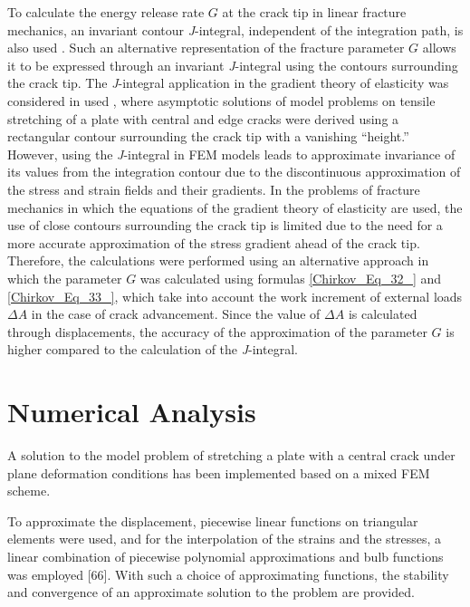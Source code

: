 To calculate the energy release rate $G$ at the crack tip in linear fracture mechanics, an invariant contour \textit{J}-integral, independent of the integration path, is also used \cite{Chirkov64, Chirkov65}. Such an alternative representation of the fracture parameter $G$ allows it to be expressed through an invariant \textit{J}-integral using the contours surrounding the crack tip. The \textit{J}-integral application in the gradient theory of elasticity was considered in used \cite{Chirkov62, Chirkov65}, where asymptotic solutions of model problems on tensile stretching of a plate with central and edge cracks were derived using a rectangular contour surrounding the crack tip with a vanishing ``height.'' However, using the \textit{J}-integral in FEM models leads to approximate invariance of its values from the integration contour due to the discontinuous approximation of the stress and strain fields and their gradients. In the problems of fracture mechanics in which the equations of the gradient theory of elasticity are used, the use of close contours surrounding the crack tip is limited due to the need for a more accurate approximation of the stress gradient ahead of the crack tip. Therefore, the calculations were performed using an alternative approach in which the parameter $G$ was calculated using formulas \eqref{Chirkov_Eq_32_} and \eqref{Chirkov_Eq_33_}, which take into account the work increment of external loads $\Delta A$ in the case of crack advancement. Since the value of $\Delta A$ is calculated through displacements, the accuracy of the approximation of the parameter $G$ is higher compared to the calculation of the \textit{J}-integral.

\section{Numerical Analysis}

A solution to the model problem of stretching a plate with a central crack under plane deformation conditions has been implemented based on a mixed FEM scheme.

To approximate the displacement, piecewise linear functions on triangular elements were used, and for the interpolation of the strains and the stresses, a linear combination of piecewise polynomial approximations and bulb functions was employed [66]. With such a choice of approximating functions, the stability and convergence of an approximate solution to the problem are provided.

